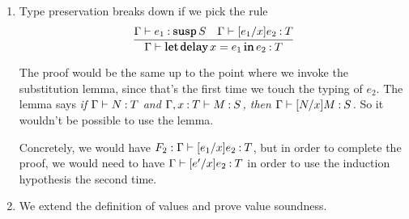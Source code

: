 \documentclass[11pt,letterpaper]{article}
\DeclareMathOperator{\LetOp}{\mathqd{let}}
\DeclareMathOperator{\InOp}{\mathqd{in}}
\newcommand{\Let}[2]{\LetOp #1 \InOp #2}
\DeclareMathOperator{\DelayOp}{\mathqd{delay}}
\newcommand{\delay}{\DelayOp}
\DeclareMathOperator{\SuspOp}{\mathqd{susp}}
\newcommand{\susp}{\SuspOp}
\begin{document}
\begin{enumerate}
\begin{proof}
\begin{description}
          By inversion of the typing rule for the $\Let{\cdot}{\cdot}$ form, we
          deduce
          \begin{align*}
            \mathcal{F}_1 &: \Gamma \proves e_1 \hastype \susp S \\
            \mathcal{F}_2 &: \Gamma, x \hastype S \proves e_2 \hastype T
          \end{align*}

          By the induction hypothesis on $\mathcal{F}_1$ and $\mathcal{D}_1$,
          we deduce
          $\Gamma \proves \delay e^\prime \hastype \susp S$.

          By inverting the typing rule for $\delay$ introduction, we deduce
          $\mathcal{F} : \Gamma \proves e^\prime \hastype S$.

          By the substitution lemma on $\mathcal{F}$ and $\mathcal{F}_2$,
          we deduce
          $\mathcal{F}^\prime : \Gamma \proves [e^\prime/x]e_2 \hastype T$.

          By the induction hypothesis on
          $\mathcal{F}^\prime$ and $\mathcal{D}^\prime$,
          we deduce $\mathcal{E} : \Gamma \proves v \hastype T$.
      \end{description}
    \end{proof}

  \item
    Type preservation breaks down if we pick the rule
    \begin{equation*}
      \infer{\Gamma \proves \Let{\delay x = e_1}{e_2} \hastype T}{%
        \Gamma \proves e_1 \hastype \susp S
        &
        \Gamma \proves [e_1/x]e_2 \hastype T
      }
    \end{equation*}

    The proof would be the same up to the point where we invoke the
    substitution lemma, since that's the first time we touch the typing of
    $e_2$.
    The lemma says
    \emph{%
      if $\Gamma \vdash N \mathbin{:} T$
      and $\Gamma, x \mathbin{:} T \vdash M \mathbin{:} S$,
      then $\Gamma \vdash [N/x]M \mathbin{:} S$.
    }
    So it wouldn't be possible to use the lemma.

    Concretely, we would have
    $F_2 : \Gamma \vdash [e_1/x]e_2 \mathbin{:} T$,
    but in order to complete the proof, we would need
    to have $\Gamma \vdash [e^\prime/x]e_2 \mathbin{:} T$
    in order to use the induction hypothesis the second time.

  \item
    We extend the definition of values and prove value soundness.


\end{enumerate}
\end{document}
